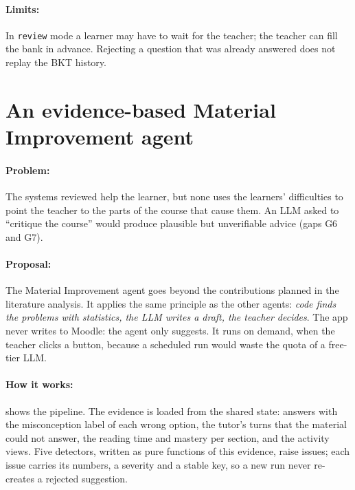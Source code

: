 \paragraph{Limits:} In \texttt{review} mode a learner may have to wait
for the teacher; the teacher can fill the bank in advance. Rejecting a
question that was already answered does not replay the BKT history.

\section[The Material Improvement agent]{An evidence-based Material Improvement agent}
\label{sec-c7}

\paragraph{Problem:} The systems reviewed help the learner, but none uses
the learners' difficulties to point the teacher to the parts of the
course that cause them. An LLM asked to ``critique the course'' would
produce plausible but unverifiable advice (gaps G6 and G7).

\paragraph{Proposal:} The Material Improvement agent goes beyond the
contributions planned in the literature analysis. It applies the same
principle as the other agents: \emph{code finds the problems with
statistics, the LLM writes a draft, the teacher decides}. The app never
writes to Moodle: the agent only suggests. It runs on demand, when the
teacher clicks a button, because a scheduled run would waste the quota of
a free-tier LLM.

\paragraph{How it works:}  shows the
pipeline. The evidence is loaded from the shared state: answers with the
misconception label of each wrong option, the tutor's turns that the
material could not answer, the reading time and mastery per section, and
the activity views. Five detectors, written as pure functions of this
evidence, raise issues; each issue carries its numbers, a severity and a
stable key, so a new run never re-creates a rejected suggestion.

